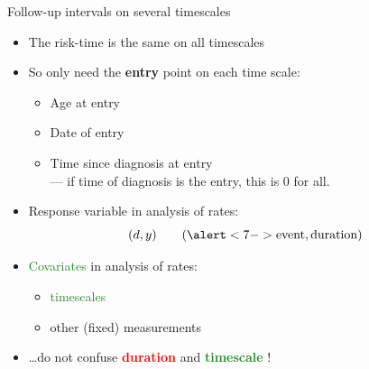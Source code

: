 


\begin{frame}[fragile]{Follow-up intervals on several timescales}
  \begin{itemize}[<+->]
  \item The risk-time is the same on all timescales
  \item So only need the \textbf{entry} point on each time scale:

  \begin{itemize}
    \item Age at entry
    \item Date of entry
    \item Time since diagnosis at entry\\
          --- if time of diagnosis is the entry, this is $0$ for all.
  \end{itemize}

  \item \alert<7->{Response variable} in analysis of rates:\\[-1em]
\[ (d,y) \qquad (\alert<7->{\text{event}, \text{duration}}) \]
  \item \textcolor{forestgreen}{Covariates} in analysis of rates:

  \begin{itemize}[<+->]
    \item \textcolor{forestgreen}{timescales}
    \item other (fixed) measurements
  \end{itemize}
\item \ldots do not confuse  \textcolor{red}{\textbf{duration}} and
                     \textcolor{forestgreen}{\textbf{timescale}} !
  \end{itemize}
\end{frame}


